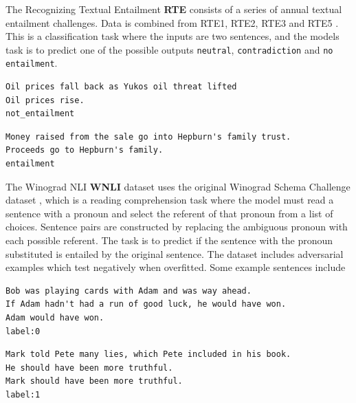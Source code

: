 \documentclass[a4paper,12pt,oneside,openright]{report}
\begin{document}
The Recognizing Textual Entailment \textbf{RTE} consists of a series of annual textual entailment challenges. 
Data is combined from RTE1, RTE2, RTE3 and RTE5 \cite{dagan2005} \cite{bar2006} \cite{bentivogli2009} \cite{giampiccolo2007}. 
This is a classification task where the inputs are two sentences, and the models task is to predict one of the possible outputs \texttt{neutral}, \texttt{contradiction} and \texttt{no entailment}.

\begin{tcolorbox}
\begin{verbatim}
Oil prices fall back as Yukos oil threat lifted	
Oil prices rise.
not_entailment
\end{verbatim}
\end{tcolorbox}

\begin{tcolorbox}
\begin{verbatim}
Money raised from the sale go into Hepburn's family trust.
Proceeds go to Hepburn's family.	
entailment
\end{verbatim}
\end{tcolorbox}

The Winograd NLI \textbf{WNLI} dataset uses the original Winograd Schema Challenge dataset \cite{levesque2012}, which is a reading comprehension task where the model must read a sentence with a pronoun and select the referent of that pronoun from a list of choices. 
Sentence pairs are constructed by replacing the ambiguous pronoun with each possible referent.
The task is to predict if the sentence with the pronoun substituted is entailed by the original sentence.
The dataset includes adversarial examples which test negatively when overfitted.
Some example sentences include 

\begin{tcolorbox}
\begin{verbatim}
Bob was playing cards with Adam and was way ahead.
If Adam hadn't had a run of good luck, he would have won.	
Adam would have won.
label:0
\end{verbatim}
\end{tcolorbox}

\begin{tcolorbox}
\begin{verbatim}
Mark told Pete many lies, which Pete included in his book. 
He should have been more truthful.	
Mark should have been more truthful.
label:1
\end{verbatim}
\end{tcolorbox}
\end{document}
